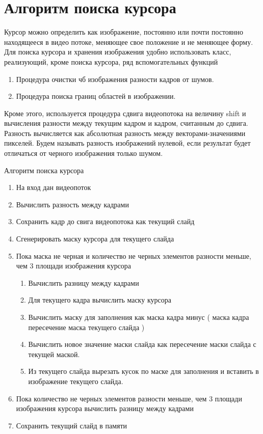 \documentclass[oneside,final,14pt]{extreport}
\begin{document}
\section{Алгоритм поиска курсора}
Курсор можно определить как изображение, постоянно или почти постоянно находящееся в видео потоке, меняющее свое положение и не меняющее форму. Для поиска курсора и хранения изображения удобно использовать класс, реализующий, кроме поиска курсора, ряд вспомогательных функций

\begin{enumerate}
\item Процедура очистки чб изображения разности кадров от шумов.
\item Процедура поиска границ областей в изображении.
\end{enumerate}

Кроме этого, используется процедура сдвига  видеопотока на величину shift и вычисления разности между текущим кадром и кадром, считанным до сдвига.
Разность вычисляется как абсолютная разность между векторами-значениями пикселей. Будем называть разность изображений нулевой, если результат будет отличаться от черного изображения только шумом.

Алгоритм поиска курсора

\begin{enumerate}
\item На вход дан видеопоток
\item Вычислить  разность между кадрами
\item Сохранить кадр до свига видеопотока как текущий слайд
\item Сгенерировать маску курсора для текущего слайда
\item Пока маска не черная и количество не черных элементов разности меньше, чем 3 площади изображения курсора
\begin{enumerate}
	\item Вычислить разницу между кадрами
	\item Для текущего кадра вычислить маску курсора
	\item Вычислить маску для заполнения как маска кадра минус ( маска кадра пересечение маска текущего слайда )
	\item Вычислить новое значение маски слайда как пересечение маски слайда с текущей маской.
	\item Из текущего слайда вырезать кусок по маске для заполнения и вставить в изображение текущего слайда.
\end{enumerate}
\item Пока количество не черных элементов разности меньше, чем 3 площади изображения курсора вычислить разницу между кадрами
\item Сохранить текущий слайд в памяти
\end{enumerate}
\end{document}
